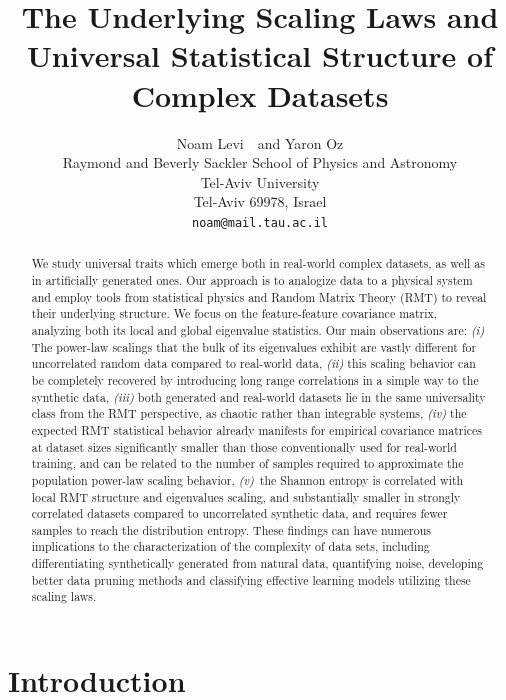 \documentclass{article}
\title{The Underlying Scaling Laws and Universal Statistical Structure of Complex Datasets }
\author{%
  Noam Levi~~and Yaron Oz \\
  Raymond and Beverly Sackler School of Physics and Astronomy\\
  Tel-Aviv University\\
  Tel-Aviv 69978, Israel \\
  \texttt{noam@mail.tau.ac.il} \\
}
\begin{document}
\maketitle


\begin{abstract}
We study universal traits which emerge both in real-world complex datasets, as well as in artificially generated ones. Our approach is to analogize data to a physical system and employ tools from statistical physics and Random Matrix Theory (RMT) to reveal  their underlying structure. We focus on the feature-feature covariance matrix, analyzing both its local and global eigenvalue statistics. 
Our main observations are: {\it (i)} The power-law scalings that the bulk of its eigenvalues exhibit are vastly different for uncorrelated random data compared to real-world data, {\it (ii)}  this scaling behavior can be completely recovered by introducing long range correlations in a simple way to the synthetic data, {\it (iii)} both generated and real-world datasets lie in the same universality class from the RMT perspective, as chaotic rather than integrable systems, {\it (iv)} the expected RMT statistical behavior already manifests for empirical covariance matrices at dataset sizes significantly smaller than those conventionally used for real-world training, and can be related to the number of samples required to approximate the population power-law scaling behavior, {\it (v)}~the Shannon entropy is correlated with local RMT structure and eigenvalues scaling, and substantially smaller in strongly correlated datasets compared to uncorrelated synthetic data, and requires fewer samples to reach the distribution entropy. These findings can have numerous implications
to the characterization of the complexity of data sets, including differentiating synthetically generated from natural data, quantifying noise, developing better data pruning methods and classifying 
effective learning models utilizing these scaling laws.

\end{abstract}




\section{Introduction}
\end{document}
